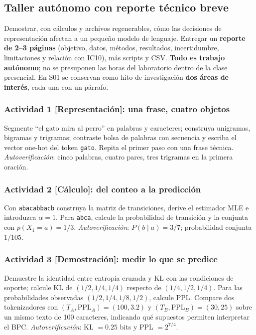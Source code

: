 


\subsection{Taller autónomo con reporte técnico breve}
\label{s01:mod:taller}
\begin{taller}
Demostrar, con cálculos y archivos regenerables, cómo las decisiones de
representación afectan a un pequeño modelo de lenguaje. Entregar un
\textbf{reporte de 2--3 páginas} (objetivo, datos, métodos, resultados,
incertidumbre, limitaciones y relación con IC10), más scripts y CSV.
\textbf{Todo es trabajo autónomo}; no se presuponen las horas del laboratorio
dentro de la clase presencial. En S01 se conservan como hito de investigación
\textbf{dos áreas de interés}, cada una con un párrafo.
\end{taller}
\subsubsection*{Actividad 1 [Representación]: una frase, cuatro objetos}
Segmente ``el gato mira al perro'' en palabras y caracteres; construya
unigramas, bigramas y trigramas; contraste bolsa de palabras con secuencia y
escriba el vector one-hot del token \texttt{gato}. Repita el primer paso con
una frase técnica. \emph{Autoverificación}: cinco palabras, cuatro pares,
tres trigramas en la primera oración.
\subsubsection*{Actividad 2 [Cálculo]: del conteo a la predicción}
Con \texttt{abacabbacb} construya la matriz de transiciones, derive el
estimador MLE e introduzca $\alpha=1$. Para \texttt{abca}, calcule la
probabilidad de transición y la conjunta con $p(X_1=a)=1/3$.
\emph{Autoverificación}: $P(b\mid a)=3/7$; probabilidad conjunta $1/105$.
\subsubsection*{Actividad 3 [Demostración]: medir lo que se predice}
Demuestre la identidad entre entropía cruzada y KL con las condiciones de
soporte; calcule KL de $(1/2,1/4,1/4)$ respecto de
$(1/4,1/2,1/4)$. Para las probabilidades observadas
$(1/2,1/4,1/8,1/2)$, calcule PPL. Compare dos tokenizadores con
$(T_A,\mathrm{PPL}_A)=(100,3.2)$ y $(T_B,\mathrm{PPL}_B)=(30,25)$
sobre un mismo texto de 100 caracteres, indicando qué supuestos permiten
interpretar el BPC. \emph{Autoverificación}: KL $=0.25$ bits y
PPL $=2^{7/4}$.
